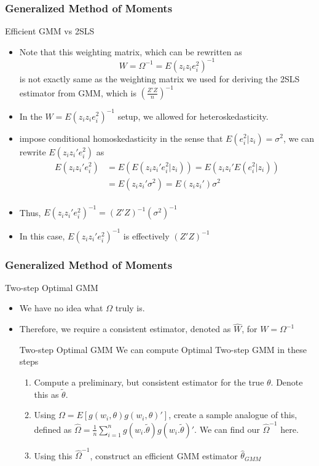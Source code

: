 \documentclass{beamer}
\begin{document}
\begin{frame}
\frametitle{Generalized Method of Moments}
Efficient GMM vs 2SLS
\begin{itemize}
\item  Note that this weighting matrix, which can be rewritten as
\[
W=\Omega^{-1}=E(z_iz_ie_i^2)^{-1}
\]
is not exactly same as the weighting matrix we used for deriving the 2SLS estimator from GMM, which is $\left(\frac{Z'Z}{n}\right)^{-1}$
\item In the $W=E(z_iz_ie_i^2)^{-1}$ setup, we allowed for heteroskedasticity.
\item impose conditional homoskedasticity in the sense that $E(e_i^2|z_i)=\sigma^2$, we can rewrite $E(z_iz_i'e_i^2)$ as
\[
\begin{aligned}
E(z_iz_i'e_i^2)&=E(E(z_iz_i'e_i^2|z_i))=E(z_iz_i'E(e_i^2|z_i))\\
&=E(z_iz_i'\sigma^2)=E(z_iz_i')\sigma^2\\
\end{aligned}
\]
\item Thus, $E(z_iz_i'e_i^2)^{-1}=(Z'Z)^{-1}(\sigma^2)^{-1}$
\item In this case, $E(z_iz_i'e_i^2)^{-1}$ is effectively $(Z'Z)^{-1}$
\end{itemize}
\end{frame}

\begin{frame}
\frametitle{Generalized Method of Moments}
Two-step Optimal GMM
\begin{itemize}
\item We have no idea what $\Omega$ truly is. 
\item Therefore, we require a consistent estimator, denoted as $\widehat{W}$, for $W=\Omega^{-1}$
\begin{block}{Two-step Optimal GMM}
We can compute Optimal Two-step GMM in these steps
\begin{enumerate}
\item Compute a preliminary, but consistent estimator for the true $\theta$. Denote this as $\tilde{\theta}$. 
\item Using $\Omega=E[g(w_i,\theta)g(w_i,\theta)']$, create a sample analogue of this, defined as $\widehat{\Omega}=\frac{1}{n}\sum_{i=1}^n g(w_i.\tilde{\theta})g(w_i.\tilde{\theta})'$. We can find our $\widehat{\Omega}^{-1}$ here. 
\item Using this $\widehat{\Omega}^{-1}$, construct an efficient GMM estimator $\hat{\theta}_{GMM}$
\end{enumerate}
\end{block}
\end{itemize}
\end{frame}
\end{document}
